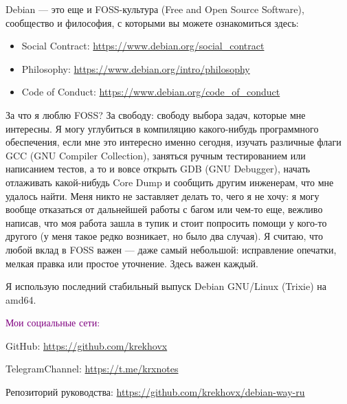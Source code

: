 Debian --- это еще и FOSS-культура (Free and Open Source Software), сообщество и
философия, с которыми вы можете ознакомиться здесь:
\begin{itemize}
    \vspace{-0.3cm}
    \item Social Contract: \url{https://www.debian.org/social_contract}
    \item Philosophy: \url{https://www.debian.org/intro/philosophy}
    \item Code of Conduct: \url{https://www.debian.org/code_of_conduct}
    \vspace{-0.3cm}
\end{itemize}

За что я люблю FOSS? За свободу: свободу выбора задач, которые мне интересны.
Я могу углубиться в компиляцию какого-нибудь программного обеспечения, если мне
это интересно именно сегодня, изучать различные флаги GCC (GNU Compiler
Collection), заняться ручным тестированием или написанием тестов, а то и вовсе
открыть GDB (GNU Debugger), начать отлаживать какой-нибудь Core Dump и сообщить
другим инженерам, что мне удалось найти. Меня никто не заставляет делать то,
чего я не хочу: я могу вообще отказаться от дальнейшей работы с багом или чем-то
еще, вежливо написав, что моя работа зашла в тупик и стоит попросить помощи у
кого-то другого (у меня такое редко возникает, но было два случая). Я считаю,
что любой вклад в FOSS важен --- даже самый небольшой: исправление опечатки,
мелкая правка или простое уточнение. Здесь важен каждый.

Я использую последний стабильный выпуск Debian GNU/Linux (Trixie) на amd64.

\textcolor{purple}{Мои социальные сети:}

GitHub: \url{https://github.com/krekhovx}

TelegramChannel: \url{https://t.me/krxnotes}

Репозиторий руководства: \url{https://github.com/krekhovx/debian-way-ru}
